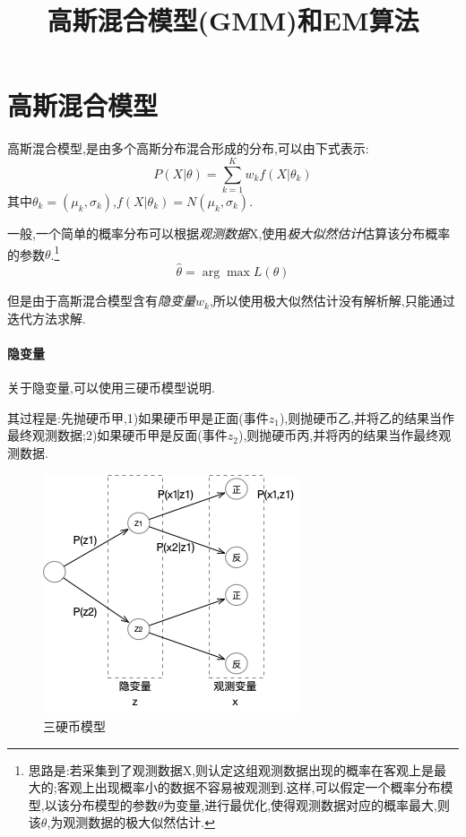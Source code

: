 \documentclass{ctexrep}
\begin{document}
\title{高斯混合模型(GMM)和EM算法}
\maketitle


	
\section{高斯混合模型}

高斯混合模型,是由多个高斯分布混合形成的分布,可以由下式表示:
$$P(X|\theta)=\sum_{k=1}^K{w_kf(X|\theta_k)}$$
其中$\theta_k=(\mu_k,\sigma_k)$,$f(X|\theta_k)=N(\mu_k,\sigma_k)$.

一般,一个简单的概率分布可以根据\emph{观测数据}X,使用\emph{极大似然估计}估算该分布概率的参数$\theta$.\footnote{思路是:若采集到了观测数据X,则认定这组观测数据出现的概率在客观上是最大的;客观上出现概率小的数据不容易被观测到.这样,可以假定一个概率分布模型,以该分布模型的参数$\theta$为变量,进行最优化,使得观测数据对应的概率最大,则该$\theta$,为观测数据的极大似然估计\cite{概率论-茆}.}
$$\hat{\theta}=\arg\max L(\theta)$$

但是由于高斯混合模型含有\emph{隐变量}$w_k$,所以使用极大似然估计没有解析解,只能通过迭代方法求解.

\paragraph{隐变量}
关于隐变量,可以使用三硬币模型说明.\cite{统计学习方法}

其过程是:先抛硬币甲,1)如果硬币甲是正面(事件$z_1$),则抛硬币乙,并将乙的结果当作最终观测数据;2)如果硬币甲是反面(事件$z_2$),则抛硬币丙,并将丙的结果当作最终观测数据.

\begin{figure}[hbt]
	\centering
	\includegraphics[width=.5\linewidth]{三硬币示意图.png}
	\caption{三硬币模型}
	\label{三硬币模型}
\end{figure}
\end{document}
